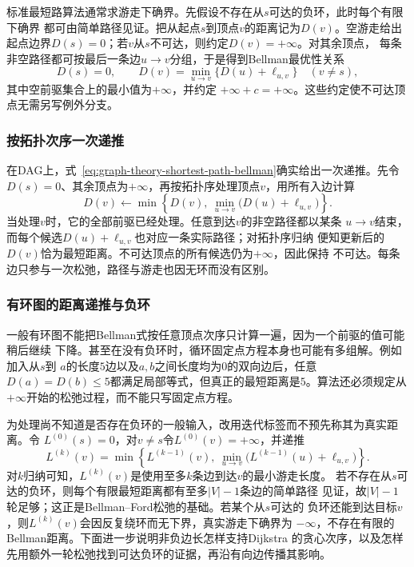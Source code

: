 标准最短路算法通常求游走下确界。先假设不存在从\(s\)可达的负环，此时每个有限下确界
都可由简单路径见证。把从起点\(s\)到顶点\(v\)的距离记为\(D(v)\)。空游走给出
起点边界\(D(s)=0\)；若\(v\)从\(s\)不可达，则约定\(D(v)=+\infty\)。对其余顶点，
每条非空路径都可按最后一条边\(u\to v\)分组，于是得到Bellman最优性关系
\begin{equation}
  D(s)=0,\qquad
  D(v)=\min_{u\to v}\{D(u)+\ell_{u,v}\}\quad(v\neq s),
  \label{eq:graph-theory-shortest-path-bellman}
\end{equation}
其中空前驱集合上的最小值为\(+\infty\)，并约定
\(+\infty+c=+\infty\)。这些约定使不可达顶点无需另写例外分支。

\subsubsection{按拓扑次序一次递推}

在DAG上，式~\eqref{eq:graph-theory-shortest-path-bellman}确实给出一次递推。先令
\(D(s)=0\)、其余顶点为\(+\infty\)，再按拓扑序处理顶点\(v\)，用所有入边计算
\[
  D(v)\leftarrow
  \min\left\{D(v),\ \min_{u\to v}\bigl(D(u)+\ell_{u,v}\bigr)\right\}.
\]
当处理\(v\)时，它的全部前驱已经处理。任意到达\(v\)的非空路径都以某条
\(u\to v\)结束，而每个候选\(D(u)+\ell_{u,v}\)也对应一条实际路径；对拓扑序归纳
便知更新后的\(D(v)\)恰为最短距离。不可达顶点的所有候选仍为\(+\infty\)，因此保持
不可达。每条边只参与一次松弛，路径与游走也因无环而没有区别。

\subsubsection{有环图的距离递推与负环}

一般有环图不能把Bellman式按任意顶点次序只计算一遍，因为一个前驱的值可能稍后继续
下降。甚至在没有负环时，循环固定点方程本身也可能有多组解。例如加入从\(s\)到
\(a\)的长度\(5\)边以及\(a,b\)之间长度均为\(0\)的双向边后，任意
\(D(a)=D(b)\leq5\)都满足局部等式，但真正的最短距离是\(5\)。算法还必须规定从
\(+\infty\)开始的松弛过程，而不能只写固定点方程。

为处理尚不知道是否存在负环的一般输入，改用迭代标签而不预先称其为真实距离。令
\(L^{(0)}(s)=0\)，对\(v\neq s\)令\(L^{(0)}(v)=+\infty\)，并递推
\[
  L^{(k)}(v)=
  \min\left\{
    L^{(k-1)}(v),\
    \min_{u\to v}\bigl(L^{(k-1)}(u)+\ell_{u,v}\bigr)
  \right\}.
\]
对\(k\)归纳可知，\(L^{(k)}(v)\)是使用至多\(k\)条边到达\(v\)的最小游走长度。
若不存在从\(s\)可达的负环，则每个有限最短距离都有至多\(|V|-1\)条边的简单路径
见证，故\(|V|-1\)轮足够；这正是Bellman--Ford松弛的基础。若某个从\(s\)可达的
负环还能到达目标\(v\)，则\(L^{(k)}(v)\)会因反复绕环而无下界，真实游走下确界为
\(-\infty\)，不存在有限的Bellman距离。下面进一步说明非负边长怎样支持Dijkstra
的贪心次序，以及怎样先用额外一轮松弛找到可达负环的证据，再沿有向边传播其影响。

